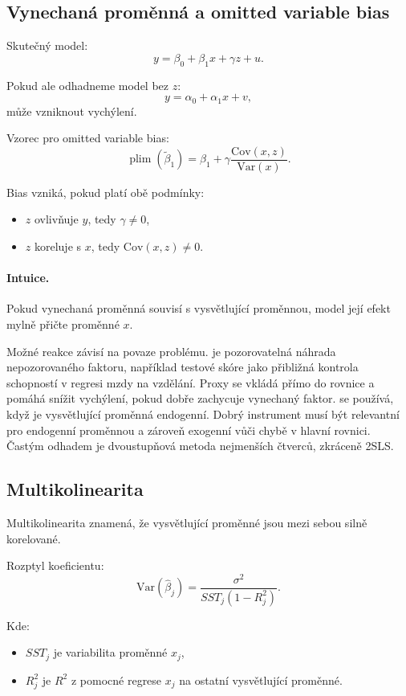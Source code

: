\subsection{Vynechaná proměnná a omitted variable bias}

Skutečný model:
\[
y=\beta_0+\beta_1x+\gamma z+u.
\]

Pokud ale odhadneme model bez $z$:
\[
y=\alpha_0+\alpha_1x+v,
\]
může vzniknout vychýlení.

Vzorec pro omitted variable bias:
\[
\operatorname{plim}(\tilde\beta_1)
=
\beta_1
+
\gamma\frac{\mathrm{Cov}(x,z)}{\mathrm{Var}(x)}.
\]

Bias vzniká, pokud platí obě podmínky:
\begin{itemize}
    \item $z$ ovlivňuje $y$, tedy $\gamma\neq 0$,
    \item $z$ koreluje s $x$, tedy $\mathrm{Cov}(x,z)\neq 0$.
\end{itemize}

\paragraph{Intuice.}
Pokud vynechaná proměnná souvisí s vysvětlující proměnnou, model její efekt mylně přičte proměnné $x$.

Možné reakce závisí na povaze problému.  je pozorovatelná náhrada nepozorovaného
faktoru, například testové skóre jako přibližná kontrola schopností v regresi mzdy na vzdělání.
Proxy se vkládá přímo do rovnice a pomáhá snížit vychýlení, pokud dobře zachycuje vynechaný faktor.
 se používá, když je vysvětlující proměnná endogenní. Dobrý instrument
musí být relevantní pro endogenní proměnnou a zároveň exogenní vůči chybě v hlavní rovnici. Častým
odhadem je dvoustupňová metoda nejmenších čtverců, zkráceně 2SLS.

\subsection{Multikolinearita}

Multikolinearita znamená, že vysvětlující proměnné jsou mezi sebou silně korelované.

Rozptyl koeficientu:
\[
\mathrm{Var}(\hat\beta_j)
=
\frac{\sigma^2}{SST_j(1-R_j^2)}.
\]

Kde:
\begin{itemize}
    \item $SST_j$ je variabilita proměnné $x_j$,
    \item $R_j^2$ je $R^2$ z pomocné regrese $x_j$ na ostatní vysvětlující proměnné.
\end{itemize}

